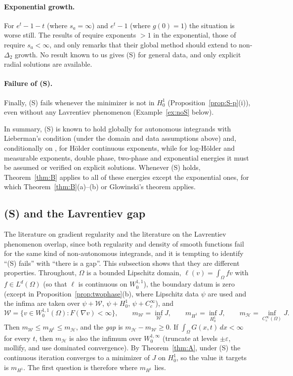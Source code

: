 \documentclass[11pt]{amsart}
\theoremstyle{definition}
\theoremstyle{remark}
\numberwithin{equation}{section}
\newcommand{\dx}{\,dx}
\newcommand{\Wc}{\mathcal W}
\newcommand{\mW}{m_{\mathcal W}}
\newcommand{\mH}{m_{\mathcal H}}
\newcommand{\mHone}{m_{H^1}}
\begin{document}
\paragraph{Exponential growth.} For $e^t-1-t$ (where $s_a=\infty$) and $e^t-1$ (where $g(0)=1$) the situation is worse still. The results of \cite[Thms.~1.4--1.5]{DeFilippisMingione2021} require exponents $>1$ in the exponential, those of \cite{CianchiMazya2018,Antonini2026} require $s_a<\infty$, and \cite[p.~4]{DeFilippisPiccinini2022} only remarks that their global method should extend to non-$\Delta_2$ growth. No result known to us gives (S) for general data, and only explicit radial solutions are available.

\paragraph{Failure of (S).} Finally, (S) fails whenever the minimizer is not in $H^1_0$ (Proposition~\ref{prop:S-p}(i)), even without any Lavrentiev phenomenon (Example~\ref{ex:noS} below).

In summary, (S) is known to hold globally for autonomous integrands with Lieberman's condition (under the domain and data assumptions above) and, conditionally on \cite{Fan2007}, for H\"older continuous exponents, while for log-H\"older and measurable exponents, double phase, two-phase and exponential energies it must be assumed or verified on explicit solutions. Whenever (S) holds, Theorem~\ref{thm:B} applies to all of these energies except the exponential ones, for which Theorem~\ref{thm:B}(a)--(b) or Glowinski's theorem applies.


\subsection{(S) and the Lavrentiev gap}\label{ssec:SvsGap}
The literature on gradient regularity and the literature on the Lavrentiev phenomenon overlap, since both regularity and density of smooth functions fail for the same kind of non-autonomous integrands, and it is tempting to identify ``(S) fails'' with ``there is a gap''. This subsection shows that they are different properties. Throughout, $\Omega$ is a bounded Lipschitz domain, $\ell(v)=\int_\Omega fv$ with $f\in L^d(\Omega)$ (so that $\ell$ is continuous on $W^{1,1}_0$), the boundary datum is zero (except in Proposition~\ref{prop:twophase}(b), where Lipschitz data $\psi$ are used and the infima are taken over $\psi+\Wc$, $\psi+H^1_0$, $\psi+C^\infty_c$), and
\[
\Wc=\{v\in W^{1,1}_0(\Omega):F(\nabla v)<\infty\},\qquad
\mW=\inf_{\Wc}J,\qquad \mHone=\inf_{H^1_0}J,\qquad \mH=\inf_{C^\infty_c(\Omega)}J .
\]
Then $\mW\le\mHone\le\mH$, and the \emph{gap} is $\mH-\mW\ge0$. If $\int_\Omega G(x,t)\dx<\infty$ for every $t$, then $\mH$ is also the infimum over $W^{1,\infty}_0$ (truncate at levels $\pm\varepsilon$, mollify, and use dominated convergence). By Theorem~\ref{thm:A}, under (S) the continuous iteration converges to a minimizer of $J$ on $H^1_0$, so the value it targets is $\mHone$. The first question is therefore where $\mHone$ lies.
\end{document}
